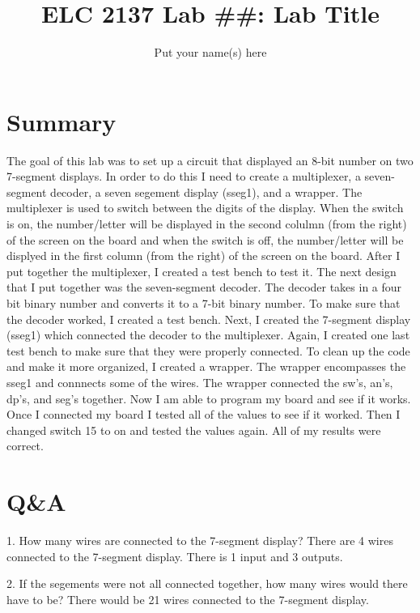 \documentclass[11pt]{article}
\begin{document}
\title{ELC 2137 Lab \#\#: Lab Title}
\author{Put your name(s) here}

\maketitle


\section*{Summary}

The goal of this lab was to set up a circuit that displayed an 8-bit number on two 7-segment displays. In order to do this I need to create a multiplexer, a seven-segment decoder, a seven segement display (sseg1), and a wrapper. The multiplexer is used to switch between the digits of the display. When the switch is on, the number/letter will be displayed in the second colulmn (from the right) of the screen on the board and when the switch is off, the number/letter will be displyed in the first column (from the right) of the screen on the board. After I put together the multiplexer, I created a test bench to test it. The next design that I put together was the seven-segment decoder. The decoder takes in a four bit binary number and converts it to a 7-bit binary number. To make sure that the decoder worked, I created a test bench. Next, I created the 7-segment display (sseg1) which connected the decoder to the multiplexer. Again, I created one last test bench to make sure that they were properly connected. To clean up the code and make it more organized, I created a wrapper. The wrapper encompasses the sseg1 and connnects some of the wires. The wrapper connected the sw's, an's, dp's, and seg's together. Now I am able to program my board and see if it works. Once I connected my board I tested all of the values to see if it worked. Then I changed switch 15 to on and tested the values again. All of my results were correct. 


\section*{Q\&A}

1. How many wires are connected to the 7-segment display? \newline
There are 4 wires connected to the 7-segment display. There is 1 input and 3 outputs. \newline


2. If the segements were not all connected together, how many wires would there have to be? \newline
There would be 21 wires connected to the 7-segment display. \newline
\end{document}
